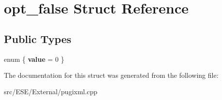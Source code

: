 \hypertarget{structopt__false}{\section{opt\-\_\-false Struct Reference}
\label{structopt__false}
}
\subsection*{Public Types}
\begin{DoxyCompactItemize}
\item 
enum \{ {\bfseries value} = 0
 \}
\end{DoxyCompactItemize}


The documentation for this struct was generated from the following file\-:\begin{DoxyCompactItemize}
\item 
src/\-E\-S\-E/\-External/pugixml.\-cpp\end{DoxyCompactItemize}
